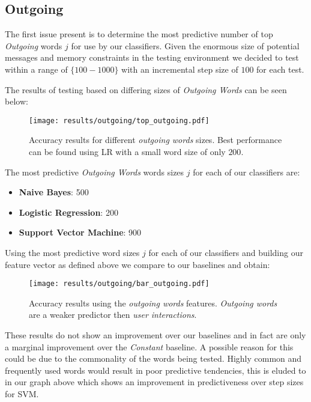 \subsection{Outgoing}
\label{sec:id}

The first issue present is to determine the most predictive number of top \emph{Outgoing} words $j$ for use by our classifiers. 
Given the enormous size of potential messages and memory constraints in the testing environment we decided to test within a range 
of $\{100-1000\}$ with an incremental step size of $100$ for each test.

The results of testing based on differing sizes of \emph{Outgoing Words} can be seen below:

\begin{figure}[h]
	\begin{center}
		\texttt{[image: results/outgoing/top\_outgoing.pdf]}
		\caption{Accuracy results for different \emph{outgoing words} sizes. Best performance can be found using LR with a small word size of only	 $200$.}
	\end{center}
\end{figure}

The most predictive \emph{Outgoing Words} words sizes $j$ for each of our classifiers are:
\begin{itemize}
\item \textbf{Naive Bayes}: 500
\item \textbf{Logistic Regression}: 200
\item \textbf{Support Vector Machine}: 900
\end{itemize}

Using the most predictive word sizes $j$ for each of our classifiers and building our feature vector as defined above 
we compare to our baselines and obtain:

\begin{figure}[h]
	\begin{center}
		\texttt{[image: results/outgoing/bar\_outgoing.pdf]}
		\caption{Accuracy results using the \emph{outgoing words} features. \emph{Outgoing words} are a weaker predictor then \emph{user interactions}.}
	\end{center}
\end{figure}

These results do not show an improvement over our baselines and in fact are only a marginal improvement over the \emph{Constant} baseline. 
A possible reason for this could be due to the commonality of the words being tested. Highly common and frequently used words would 
result in poor predictive tendencies, this is eluded to in our graph above which shows an improvement in predictiveness over 
step sizes for SVM.


